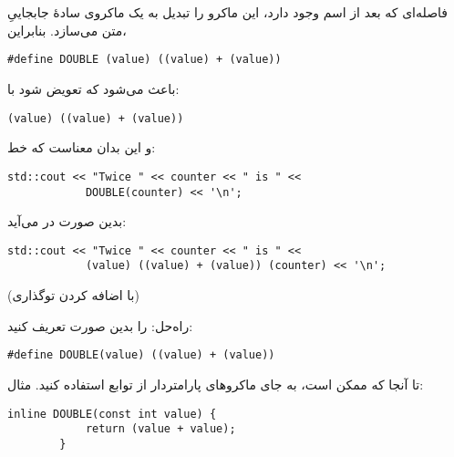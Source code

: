 \section{}
\paragraph{}\label{answer:113}
فاصله‌ای که بعد از اسم  وجود دارد، این ماکرو را تبدیل به یک ماکروی سادهٔ جابجاییِ متن می‌سازد. بنابراین،
\begin{LTR}
    \begin{lstlisting}[style=C++Style]
        #define DOUBLE (value) ((value) + (value))
    \end{lstlisting}
\end{LTR}

باعث می‌شود که  تعویض شود با:
\begin{LTR}
    \begin{lstlisting}[style=C++Style]
        (value) ((value) + (value))
    \end{lstlisting}
\end{LTR}

و این بدان معناست که خط:
\begin{LTR}
    \begin{lstlisting}[style=C++Style]
        std::cout << "Twice " << counter << " is " <<
            DOUBLE(counter) << '\n';
    \end{lstlisting}
\end{LTR}

بدین صورت در می‌آید:
\begin{LTR}
    \begin{lstlisting}[style=C++Style]
        std::cout << "Twice " << counter << " is " <<
            (value) ((value) + (value)) (counter) << '\n';
    \end{lstlisting}
\end{LTR}

(با اضافه کردن توگذاری)

راه‌حل:  را بدین صورت تعریف کنید:
\begin{LTR}
    \begin{lstlisting}[style=C++Style]
        #define DOUBLE(value) ((value) + (value))
    \end{lstlisting}
\end{LTR}

تا آنجا که ممکن است، به جای ماکروهای پارامتردار از توابع  استفاده کنید. مثال:
\begin{LTR}
    \begin{lstlisting}[style=C++Style]
        inline DOUBLE(const int value) {
            return (value + value);
        }
    \end{lstlisting}
\end{LTR}

